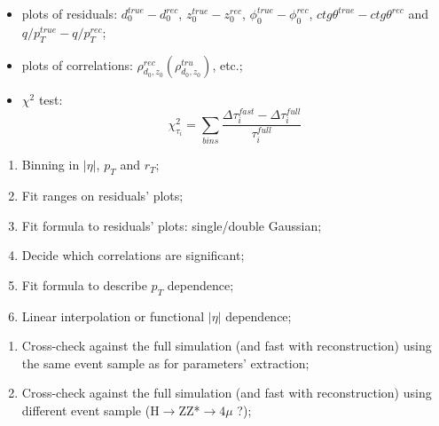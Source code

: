 
\begin{frame}
\small{
\color{violet}{\large \bf Tools:}
\begin{itemize}
\item plots of residuals: $d_0^{true}-d_0^{rec}$, $z_0^{true}-z_0^{rec}$, $\phi_0^{true}-\phi_0^{rec}$, $ctg\theta^{true}-ctg\theta^{rec}$ and $q/p_T^{true}-q/p_T^{rec}$;
\item plots of correlations: $\rho_{d_0,z_0}^{rec} (\rho_{d_0,z_0}^{tru})$, etc.;
\item $\chi^2$ test:
  $$
    \chi^2_{\tau_i}=\sum_{bins}\frac{\Delta\tau_i^{fast}-\Delta\tau_i^{full}}{\tau_i^{full}}
  $$
\end{itemize}
\vfill
\color{violet}{\large \bf Parametrisation tests:}
\begin{enumerate}
\item Binning in $\left| \eta\right|$, $p_T$ and $r_T$;
\item Fit ranges on residuals' plots;
\item Fit formula to residuals' plots: single/double Gaussian;
\item Decide which correlations are significant;
\item Fit formula to describe $p_T$ dependence;
\item Linear interpolation or functional $\left| \eta\right|$ dependence;
\end{enumerate}
\vfill
\color{violet}{\large \bf Validation:}
\begin{enumerate}
\item Cross-check against the full simulation (and fast with reconstruction) using the same event sample as for parameters' extraction;
\item Cross-check against the full simulation (and fast with reconstruction) using different event sample (H$\rightarrow$ZZ*$\rightarrow 4\mu$ ?);
\end{enumerate}
}
\vfill
\end{frame}
\restoregeometry
